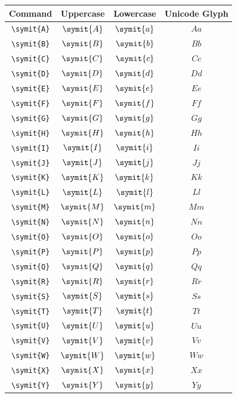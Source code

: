 \documentclass[12pt,a4paper]{article}
\begin{document}
\begin{longtable}{|c|c|c|c|}
\hline
\textbf{Command} & \textbf{Uppercase} & \textbf{Lowercase} & \textbf{Unicode Glyph} \\
\hline
\verb|\symit{A}| & $\symit{A}$ & $\symit{a}$ & $ 𝐴 𝑎 $ \\
\verb|\symit{B}| & $\symit{B}$ & $\symit{b}$ & $ 𝐵 𝑏 $ \\
\verb|\symit{C}| & $\symit{C}$ & $\symit{c}$ & $ 𝐶 𝑐 $ \\
\verb|\symit{D}| & $\symit{D}$ & $\symit{d}$ & $ 𝐷 𝑑 $ \\
\verb|\symit{E}| & $\symit{E}$ & $\symit{e}$ & $ 𝐸 𝑒 $ \\
\verb|\symit{F}| & $\symit{F}$ & $\symit{f}$ & $ 𝐹 𝑓 $ \\
\verb|\symit{G}| & $\symit{G}$ & $\symit{g}$ & $ 𝐺 𝑔 $ \\
\verb|\symit{H}| & $\symit{H}$ & $\symit{h}$ & $ 𝐻 ℎ $ \\
\verb|\symit{I}| & $\symit{I}$ & $\symit{i}$ & $ 𝐼 𝑖 $ \\
\verb|\symit{J}| & $\symit{J}$ & $\symit{j}$ & $ 𝐽 𝑗 $ \\
\verb|\symit{K}| & $\symit{K}$ & $\symit{k}$ & $ 𝐾 𝑘 $ \\
\verb|\symit{L}| & $\symit{L}$ & $\symit{l}$ & $ 𝐿 𝑙 $ \\
\verb|\symit{M}| & $\symit{M}$ & $\symit{m}$ & $ 𝑀 𝑚 $ \\
\verb|\symit{N}| & $\symit{N}$ & $\symit{n}$ & $ 𝑁 𝑛 $ \\
\verb|\symit{O}| & $\symit{O}$ & $\symit{o}$ & $ 𝑂 𝑜 $ \\
\verb|\symit{P}| & $\symit{P}$ & $\symit{p}$ & $ 𝑃 𝑝 $ \\
\verb|\symit{Q}| & $\symit{Q}$ & $\symit{q}$ & $ 𝑄 𝑞 $ \\
\verb|\symit{R}| & $\symit{R}$ & $\symit{r}$ & $ 𝑅 𝑟 $ \\
\verb|\symit{S}| & $\symit{S}$ & $\symit{s}$ & $ 𝑆 𝑠 $ \\
\verb|\symit{T}| & $\symit{T}$ & $\symit{t}$ & $ 𝑇 𝑡 $ \\
\verb|\symit{U}| & $\symit{U}$ & $\symit{u}$ & $ 𝑈 𝑢 $ \\
\verb|\symit{V}| & $\symit{V}$ & $\symit{v}$ & $ 𝑉 𝑣 $ \\
\verb|\symit{W}| & $\symit{W}$ & $\symit{w}$ & $ 𝑊 𝑤 $ \\
\verb|\symit{X}| & $\symit{X}$ & $\symit{x}$ & $ 𝑋 𝑥 $ \\
\verb|\symit{Y}| & $\symit{Y}$ & $\symit{y}$ & $ 𝑌 𝑦 $ \\

\end{longtable}
\end{document}
